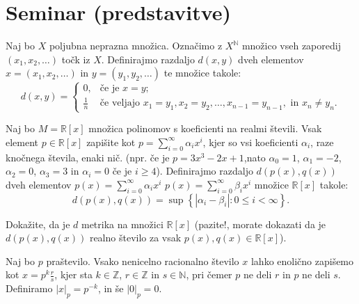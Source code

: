 \documentclass[11pt,a4paper]{exam}
\renewcommand{\leq}{\leqslant} %
\renewcommand{\geq}{\geqslant}
\renewcommand{\{}{\lbrace}
\renewcommand{\}}{\rbrace}
\begin{document}
\section*{Seminar (predstavitve)}
	\begin{questions}
		\question Naj bo $X$ poljubna neprazna množica. Označimo z $X^{\mathbb{N}}$ množico vseh zaporedij  $(x_{1}, x_{2}, \dots)$ točk iz $X$. Definirajmo razdaljo $d(x,y)$ dveh elementov $x=(x_{1}, x_{2}, \dots)$ in $y=(y_{1}, y_{2}, \dots)$ te množice takole: \[d(x,y) = \begin{cases} 0, & \text{če je } x=y;  \\ \frac{1}{n} & \text{če veljajo } x_{1}=y_{1}, x_{2}= y_{2}, \dots, x_{n-1} = y_{n-1}, \text{ in } x_{n} \neq y_{n}. \end{cases}\]

		\question Naj bo $M=\mathbb{R}[x]$ množica polinomov s koeficienti na realmi števili. Vsak element $p \in \mathbb{R}[x]$ zapišite kot $p = \sum_{i=0}^{\infty} \alpha_i x^{i}$, kjer so vsi koeficienti $\alpha_{i}$, raze knočnega števila, enaki nič. (npr. če je $p = 3x^{3} - 2x +1$,nato $\alpha_{0} = 1$, $\alpha_{1} =- 2$, $\alpha_{2} = 0$, $\alpha_{3} = 3$ in $\alpha_{i} = 0 $ če je $i \geq 4$). Definirajmo razdaljo $d \left( p(x), q(x) \right)$ dveh elementov $p(x) = \sum_{i=0}^{\infty} \alpha_{i} x^{i}$  $p(x) = \sum_{i=0}^{\infty} \beta_{i} x^{i}$ množice $\mathbb{R}[x]$ takole: \[d \left( p(x), q(x) \right) = \sup \left\{ \left| \alpha_{i} - \beta_{i} \right| : 0 \leq i < \infty \right\}.\]
		
		Dokažite, da je $d$ metrika na množici $\mathbb{R}[x]$ (pazite!, morate dokazati da je $d \left( p(x), q(x) \right)$ realno število za vsak $p(x), q(x) \in \mathbb{R}[x]$).

		\question Naj bo $p$ praštevilo. Vsako nenicelno racionalno število $x$ lahko enolično zapišemo kot $x = p^k \frac{r}{s}$, kjer sta $k \in \mathbb{Z}$, $r \in \mathbb{Z}$ in $s \in \mathbb{N}$, pri čemer $p$ ne deli $r$ in $p$ ne deli $s$. Definiramo $|x|_p = p^{-k}$, in še $|0|_p = 0$.
		\begin{parts}

\end{parts}
\end{questions}
\end{document}
